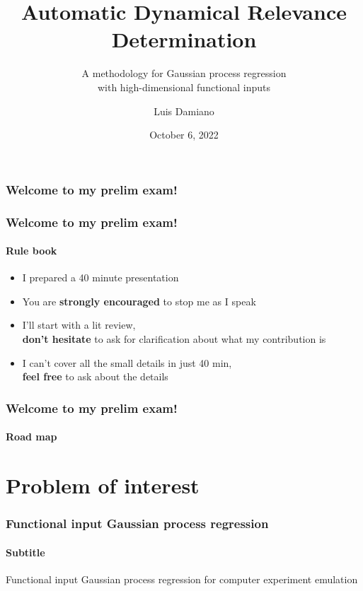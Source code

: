 \documentclass{snedecorbeamer}
\begin{document}
\title{Automatic Dynamical Relevance Determination}
\subtitle{A methodology for Gaussian process regression\\
  with high-dimensional functional inputs}
\author{Luis Damiano}
\date{October 6, 2022}

\begin{frame}
  \titlepage{}
\end{frame}

\begin{frame}
  \frametitle{Welcome to my prelim exam!}
\end{frame}

\begin{frame}
  \frametitle{Welcome to my prelim exam!}
  \framesubtitle{Rule book}

  \begin{itemize}[<+(1)->]
  \item I prepared a 40 minute presentation
  \item You are \textbf{strongly encouraged} to stop me as I speak
  \item I'll start with a lit review,\\
    \textbf{don't hesitate} to ask for clarification about what my contribution is
  \item I can't cover all the small details in just 40 min,\\
    \textbf{feel free} to ask about the details
  \end{itemize}
\end{frame}

\begin{frame}
  \frametitle{Welcome to my prelim exam!}
  \framesubtitle{Road map}

  \tableofcontents
\end{frame}

\section{Problem of interest}

\begin{frame}
  \frametitle{Functional input Gaussian process regression}
  \framesubtitle{Subtitle}

  Functional input Gaussian process regression for computer experiment emulation
\end{frame}
\end{document}
